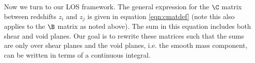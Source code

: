 Now we turn to our LOS framework. The general expression for the $\C$ matrix between redshifts $z_i$ and $z_j$ is given in equation \ref{eqn:cmatdef} (note this also applies to the $\B$ matrix as noted above). The sum in this equation includes both shear and void planes. Our goal is to rewrite these matrices such that the sums are only over shear planes and the void planes, i.e. the smooth mass component, can be written in terms of a continuous integral.  
  